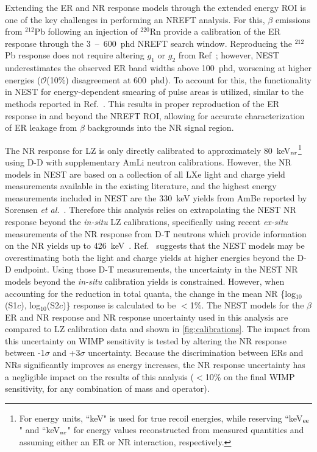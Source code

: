 \documentclass[reprint, showpacs,
preprintnumbers,
amsmath,amssymb,
aps, floatfix,
superscriptaddress,
prd, nofootinbib]{revtex4-1}
\begin{document}
Extending the ER and NR response models through the extended energy ROI is one of the key challenges in performing an NREFT analysis. For this, $\beta$ emissions from ${}^{212}$Pb following an injection of ${}^{220}$Rn provide a calibration of the ER response through the 3~--~600~phd NREFT search window. 
Reproducing the ${}^{212}$Pb response does not require altering $g_1$ or $g_2$ from Ref~\cite{LZ:SR1WS_2022}; however, NEST underestimates the observed ER band widths above 100~phd, worsening at higher energies ($\mathcal{O}$(10\%) disagreement at 600~phd). 
To account for this, the functionality in NEST for energy-dependent smearing of pulse areas is utilized, similar to the methods reported in Ref.~\cite{LUX:ER_modelling_2020}. 
This results in proper reproduction of the ER response in and beyond the NREFT ROI, allowing for accurate characterization of ER leakage from $\beta$ backgrounds into the NR signal region.
\par
The NR response for LZ is only directly calibrated to approximately 80~keV$_{\rm{nr}}$\footnote{For energy units, ``keV" is used for true recoil energies, while reserving ``keV$_{\rm{ee}}$" and ``keV$_{\rm{nr}}$" for energy values reconstructed from measured quantities and assuming either an ER or NR interaction, respectively.} using D-D with supplementary AmLi neutron calibrations. 
However, the NR models in NEST are based on a collection of all LXe light and charge yield measurements available in the existing literature, and 
the highest energy measurements included in NEST are the 330~keV yields from AmBe reported by Sorensen \textit{et al.}~\cite{Sorensen_2011}. 
Therefore this analysis relies on extrapolating the NEST NR response beyond the \textit{in-situ} LZ calibrations, specifically using recent \textit{ex-situ} measurements of the NR response from D-T neutrons which provide information on the NR yields up to 426~keV~\cite{DT_calib}. 
Ref.~\cite{DT_calib} suggests that the NEST models may be overestimating both the light and charge yields at higher energies beyond the D-D endpoint. 
Using those D-T measurements, the uncertainty in the NEST NR models beyond the \textit{in-situ} calibration yields is constrained. 
However, when accounting for the reduction in total quanta, the change in the mean NR \{log$_{10}$(S1$c$), log$_{10}$(S2$c$)\} response is calculated to be $<$1\%. 
The NEST models for the $\beta$ ER and NR response and NR response uncertainty used in this analysis are compared to LZ calibration data and shown in \autoref{fig:calibrations}.
The impact from this uncertainty on WIMP sensitivity is tested by altering the NR response between -1$\sigma$ and +3$\sigma$ uncertainty. 
Because the discrimination between ERs and NRs significantly improves as energy increases, the NR response uncertainty has a negligible impact on the results of this analysis ($<$10\% on the final WIMP sensitivity, for any combination of mass and operator). 
\end{document}

